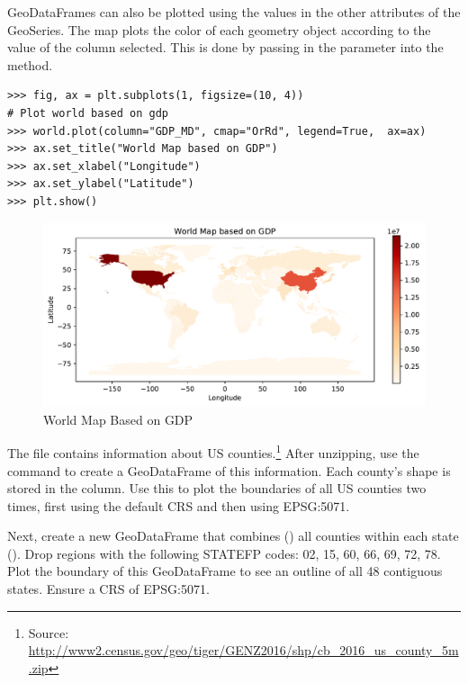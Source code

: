 GeoDataFrames can also be plotted using the values in the other attributes of the GeoSeries.
The map plots the color of each geometry object according to the value of the column selected.
This is done by passing in the parameter  into the  method.

\begin{lstlisting}
>>> fig, ax = plt.subplots(1, figsize=(10, 4))
# Plot world based on gdp
>>> world.plot(column="GDP_MD", cmap="OrRd", legend=True,  ax=ax)
>>> ax.set_title("World Map based on GDP")
>>> ax.set_xlabel("Longitude")
>>> ax.set_ylabel("Latitude")
>>> plt.show()
\end{lstlisting}

\begin{figure}[H]
\begin{center}
\includegraphics[scale=.7]{figures/gdp.pdf}
\end{center}
\caption{World Map Based on GDP}
\label{figure:gdp_map}
\end{figure}


\begin{problem}
The file  contains information about US counties.\footnote{Source: \url{http://www2.census.gov/geo/tiger/GENZ2016/shp/cb_2016_us_county_5m.zip}}
After unzipping, use the command  to create a GeoDataFrame of this information.
Each county's shape is stored in the  column.
Use this to plot the boundaries of all US counties two times, first using the default CRS and then using EPSG:5071.

Next, create a new GeoDataFrame that combines () all counties within each state ().
Drop regions with the following STATEFP codes: 02, 15, 60, 66, 69, 72, 78.
Plot the boundary of this GeoDataFrame to see an outline of all 48 contiguous states.
Ensure a CRS of EPSG:5071.
\label{problem:us_counties}
\end{problem}


